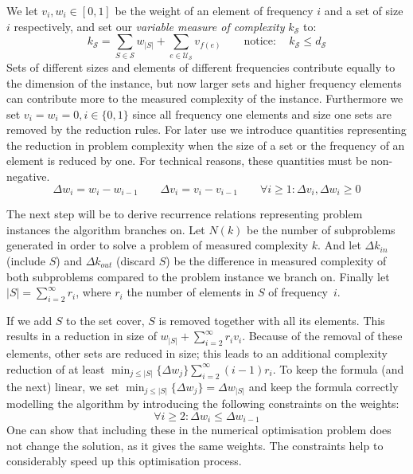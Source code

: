 \documentclass[fleqn]{stacs_proc}
\begin{document}
We let $v_i, w_i \in [0,1]$ be the weight of an element of frequency $i$ and a set of size $i$ respectively,
and set our {\em variable measure of complexity} $k_\mathcal{S}$ to:
\[ k_\mathcal{S} = \sum_{S \in \mathcal{S}} w_{|S|} + \sum_{e \in \mathcal{U_S}} v_{f(e)} 
   \qquad \mathrm{notice:} \quad k_\mathcal{S} \leq d_\mathcal{S} \]
Sets of different sizes and elements of different frequencies contribute equally to the
dimension of the instance, but now larger sets and higher frequency elements can contribute
more to the measured complexity of the instance.
Furthermore we set $v_i = w_i = 0, i \in \{0,1\}$ since all frequency one elements
and size one sets are removed by the reduction rules.
For later use we introduce quantities representing the reduction in problem complexity
when the size of a set or the frequency of an element is reduced by one.
For technical reasons, these quantities must be non-negative.
\[ \Delta w_i = w_i - w_{i-1} \qquad \Delta v_i = v_i - v_{i-1} \qquad \forall i \geq 1 : \Delta v_i, \Delta w_i \geq 0 \]

The next step will be to derive recurrence relations representing problem instances the algorithm branches on.
Let $N(k)$ be the number of subproblems generated in order to solve a problem of measured complexity $k$.
And let $\Delta k_{in}$ (include $S$) and $\Delta k_{out}$ (discard $S$) be the difference in measured complexity
of both subproblems compared to the problem instance we branch on.
Finally let $|S| = \sum_{i=2}^\infty r_i$, where $r_i$ the number of elements in $S$ of frequency~$i$.

If we add $S$ to the set cover, $S$ is removed together with all its elements.
This results in a reduction in size of $w_{|S|} + \sum_{i=2}^\infty r_i v_i$.
Because of the removal of these elements, other sets are reduced in size;
this leads to an additional complexity reduction of at least $\min_{j \leq |S|} \{ \Delta w_j \} \sum_{i=2}^\infty (i-1)r_i$.
To keep the formula (and the next) linear, we set $\min_{j \leq |S|} \{ \Delta w_j \} = \Delta w_{|S|}$
and keep the formula correctly modelling the algorithm by introducing the following constraints on the weights:
\[ \forall i \geq 2 : \Delta w_i \leq \Delta w_{i-1} \]
One can show that including these in the numerical optimisation problem
does not change the solution, as it gives the same weights.
The constraints help to considerably speed up this optimisation process.
\end{document}
